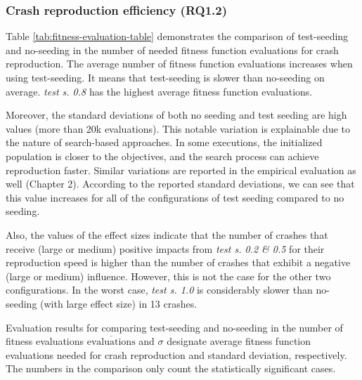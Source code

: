 \subsubsection{Crash reproduction efficiency (\textbf{RQ1.2})}

Table \ref{tab:fitness-evaluation-table} demonstrates the comparison of test-seeding and no-seeding in the number of needed fitness function evaluations for crash reproduction. The average number of fitness function evaluations increases when using test-seeding. It means that test-seeding is slower than no-seeding on average. \textit{test s. 0.8} has the highest average fitness function evaluations. 

Moreover, the standard deviations of both no seeding and test seeding are high values (more than 20k evaluations). This notable variation is explainable due to the nature of search-based approaches. In some executions, the initialized population is closer to the objectives, and the search process can achieve reproduction faster. Similar variations are reported in the \jcrashpack empirical evaluation as well (Chapter 2). According to the reported standard deviations, we can see that this value increases for all of the configurations of test seeding compared to no seeding.

Also, the values of the effect sizes indicate that the number of crashes that receive (large or medium) positive impacts from \textit{test s. 0.2 \& 0.5} for their reproduction speed is higher than the number of crashes that exhibit a negative (large or medium) influence. However, this is not the case for the other two configurations. In the worst case, \textit{test s. 1.0} is considerably slower than no-seeding (with large effect size)  in 13 crashes.


\begin{table} [t]
	\center
	\caption{Evaluation results for comparing test-seeding and no-seeding in the number of fitness evaluations $\overline{\text{evaluations}}$ and $\sigma$  designate average fitness function evaluations needed for crash reproduction and standard deviation, respectively. The numbers in the comparison only count the statistically significant cases.}
	\label{tab:fitness-evaluation-table}
	\begin{footnotesize}
	
	\end{footnotesize}
\end{table}



